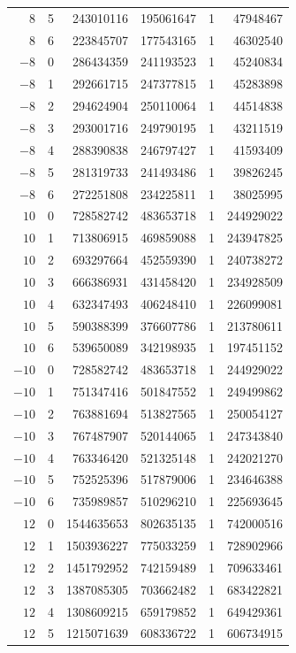 {\begin{longtable}{rrrrrr}
$8$ & 5 & 243010116 & 195061647 & 1 & 47948467\\
$8$ & 6 & 223845707 & 177543165 & 1 & 46302540\\
$-8$ & 0 & 286434359 & 241193523 & 1 & 45240834\\
$-8$ & 1 & 292661715 & 247377815 & 1 & 45283898\\
$-8$ & 2 & 294624904 & 250110064 & 1 & 44514838\\
$-8$ & 3 & 293001716 & 249790195 & 1 & 43211519\\
$-8$ & 4 & 288390838 & 246797427 & 1 & 41593409\\
$-8$ & 5 & 281319733 & 241493486 & 1 & 39826245\\
$-8$ & 6 & 272251808 & 234225811 & 1 & 38025995\\
$10$ & 0 & 728582742 & 483653718 & 1 & 244929022\\
$10$ & 1 & 713806915 & 469859088 & 1 & 243947825\\
$10$ & 2 & 693297664 & 452559390 & 1 & 240738272\\
$10$ & 3 & 666386931 & 431458420 & 1 & 234928509\\
$10$ & 4 & 632347493 & 406248410 & 1 & 226099081\\
$10$ & 5 & 590388399 & 376607786 & 1 & 213780611\\
$10$ & 6 & 539650089 & 342198935 & 1 & 197451152\\
$-10$ & 0 & 728582742 & 483653718 & 1 & 244929022\\
$-10$ & 1 & 751347416 & 501847552 & 1 & 249499862\\
$-10$ & 2 & 763881694 & 513827565 & 1 & 250054127\\
$-10$ & 3 & 767487907 & 520144065 & 1 & 247343840\\
$-10$ & 4 & 763346420 & 521325148 & 1 & 242021270\\
$-10$ & 5 & 752525396 & 517879006 & 1 & 234646388\\
$-10$ & 6 & 735989857 & 510296210 & 1 & 225693645\\
$12$ & 0 & 1544635653 & 802635135 & 1 & 742000516\\
$12$ & 1 & 1503936227 & 775033259 & 1 & 728902966\\
$12$ & 2 & 1451792952 & 742159489 & 1 & 709633461\\
$12$ & 3 & 1387085305 & 703662482 & 1 & 683422821\\
$12$ & 4 & 1308609215 & 659179852 & 1 & 649429361\\
$12$ & 5 & 1215071639 & 608336722 & 1 & 606734915\\

\end{longtable}}
